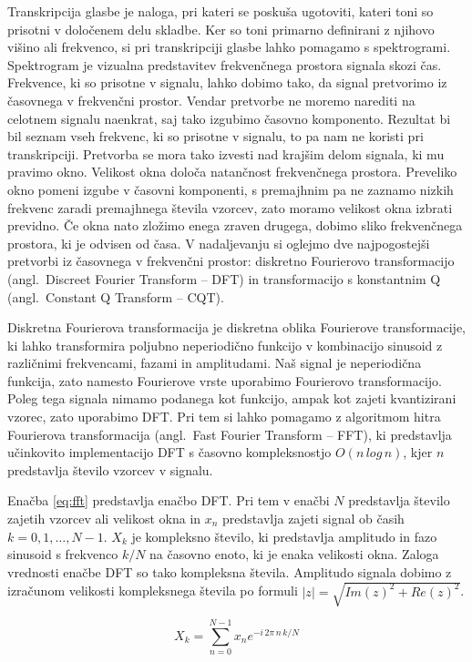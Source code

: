 \documentclass[a4paper, 12pt, openright]{book}
\newcommand{\en}{angl.}
\begin{document}
Transkripcija glasbe je naloga, pri kateri se poskuša ugotoviti, kateri toni so prisotni v določenem delu skladbe.
Ker so toni primarno definirani z njihovo višino ali frekvenco, si pri transkripciji glasbe lahko pomagamo s spektrogrami.
Spektrogram je vizualna predstavitev frekvenčnega prostora signala skozi čas.
Frekvence, ki so prisotne v signalu, lahko dobimo tako, da signal pretvorimo iz časovnega v frekvenčni prostor.
Vendar pretvorbe ne moremo narediti na celotnem signalu naenkrat, saj tako izgubimo časovno komponento.
Rezultat bi bil seznam vseh frekvenc, ki so prisotne v signalu, to pa nam ne koristi pri transkripciji.
Pretvorba se mora tako izvesti nad krajšim delom signala, ki mu pravimo okno.
Velikost okna določa natančnost frekvenčnega prostora.
Preveliko okno pomeni izgube v časovni komponenti, s premajhnim pa ne zaznamo nizkih frekvenc zaradi premajhnega števila vzorcev, zato moramo velikost okna izbrati previdno.
Če okna nato zložimo enega zraven drugega, dobimo sliko frekvenčnega prostora, ki je odvisen od časa.
V nadaljevanju si oglejmo dve najpogostejši pretvorbi iz časovnega v frekvenčni prostor: diskretno Fourierovo transformacijo (\en\ Discreet Fourier Transform -- DFT) in transformacijo s konstantnim Q (\en\ Constant Q Transform -- CQT).

Diskretna Fourierova transformacija je diskretna oblika Fourierove transformacije, ki lahko transformira poljubno neperiodično funkcijo v kombinacijo sinusoid z različnimi frekvencami, fazami in amplitudami.
Naš signal je neperiodična funkcija, zato namesto Fourierove vrste uporabimo Fourierovo transformacijo.
Poleg tega signala nimamo podanega kot funkcijo, ampak kot zajeti kvantizirani vzorec, zato uporabimo DFT.
Pri tem si lahko pomagamo z algoritmom hitra Fourierova transformacija (\en\ Fast Fourier Transform -- FFT), ki predstavlja učinkovito implementacijo DFT s časovno kompleksnostjo $ O(n\,log\,n) $, kjer $ n $ predstavlja število vzorcev v signalu.

Enačba \ref{eq:fft} predstavlja enačbo DFT.
Pri tem v enačbi $ N $ predstavlja število zajetih vzorcev ali velikost okna in $ x_n $ predstavlja zajeti signal ob časih $ k = 0, 1, \dots, N-1 $.
$ X_k $ je kompleksno število, ki predstavlja amplitudo in fazo sinusoid s frekvenco $ k/N $ na časovno enoto, ki je enaka velikosti okna.
Zaloga vrednosti enačbe DFT so tako kompleksna števila.
Amplitudo signala dobimo z izračunom velikosti kompleksnega števila po formuli $ \left|z\right|=\sqrt{Im(z)^{2}+Re(z)^{2}} $.

\begin{equation}
\label{eq:fft}
    X_k = \sum_{n=0}^{N-1}{x_n e^{-i\,2\pi\,n\,k/N}}
\end{equation}
\end{document}
